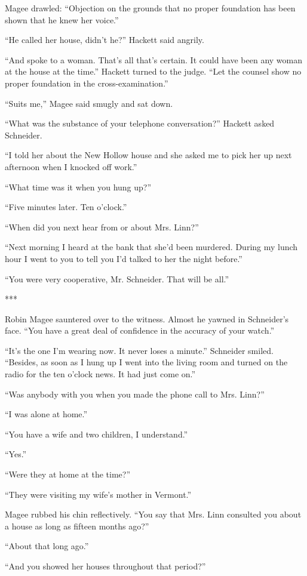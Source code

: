 \documentclass{novel}
\begin{document}
Magee drawled: “Objection on the grounds that no proper foundation has been shown that he knew her voice.”

“He called her house, didn’t he?” Hackett said angrily.

“And spoke to a woman. That’s all that’s certain. It could have been any woman at the house at the time.” Hackett turned to the judge. “Let the counsel show no proper foundation in the cross-examination.”

“Suits me,” Magee said smugly and sat down.

“What was the substance of your telephone conversation?” Hackett asked Schneider.

“I told her about the New Hollow house and she asked me to pick her up next afternoon when I knocked off work.”

“What time was it when you hung up?”

“Five minutes later. Ten o’clock.”

“When did you next hear from or about Mrs. Linn?”

“Next morning I heard at the bank that she’d been murdered. During my lunch hour I went to you to tell you I’d talked to her the night before.”

“You were very cooperative, Mr. Schneider. That will be all.”

***

Robin Magee sauntered over to the witness. Almost he yawned in Schneider’s face. “You have a great deal of confidence in the accuracy of your watch.”

“It’s the one I’m wearing now. It never loses a minute.” Schneider smiled. “Besides, as soon as I hung up I went into the living room and turned on the radio for the ten o’clock news. It had just come on.”

“Was anybody with you when you made the phone call to Mrs. Linn?”

“I was alone at home.”

“You have a wife and two children, I understand.”

“Yes.”

“Were they at home at the time?”

“They were visiting my wife’s mother in Vermont.”

Magee rubbed his chin reflectively. “You say that Mrs. Linn consulted you about a house as long as fifteen months ago?”

“About that long ago.”

“And you showed her houses throughout that period?”
\end{document}
